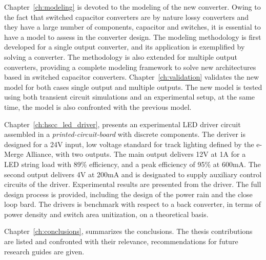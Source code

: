 Chapter~\ref{ch:modeling} is devoted to the modeling of the new converter. Owing to the fact that switched capacitor converters are by nature lossy converters and they have a large number of components, capacitor and switches, it is essential to have a model to assess in the converter design.  The modeling methodology is first developed for a single output converter, and its application is exemplified by solving a converter. The methodology is also extended for multiple output converters, providing a complete modeling framework to solve new architectures based in switched capacitor converters. Chapter~\ref{ch:validation} validates the new model for both cases single output and multiple outputs. The new model is tested using both transient circuit simulations and an experimental setup, at the same time, the model is also confronted with the previous model. 

Chapter~\ref{ch:hscc_led_driver}, presents an experimental LED driver circuit assembled in a \emph{printed-circuit-board} with discrete components. The deriver is designed for a 24V input, low voltage standard for track lighting defined by the e-Merge Alliance, with two outputs. The main output delivers 12V at 1A for a LED string load with 89\% efficiency, and a peak efficiency of 95\% at 600mA. The second output delivers 4V at 200mA and is designated to supply auxiliary control circuits of the driver. Experimental results are presented from the driver. The full design process is provided, including the design of the power rain and the close loop bard.  The drivers is benchmark with respect to a back converter, in terms of power density and switch area unitization, on a theoretical basis.

Chapter~\ref{ch:conclusions}, summarizes the conclusions.  The thesis contributions are listed and confronted with their relevance, recommendations for future research guides are given.


 